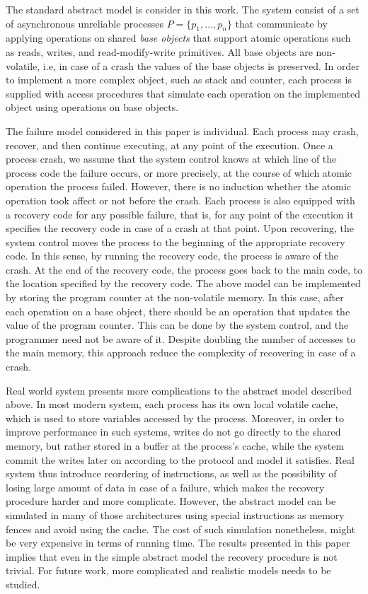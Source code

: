 \documentclass{article}
\begin{document}
The standard abstract model is consider in this work. The system consist of a set of asynchronous unreliable processes $P=\{p_1,\ldots,p_n\}$ that communicate by applying operations on shared \emph{base objects} that support atomic operations such as reads, writes, and read-modify-write primitives. All base objects are non-volatile, i.e, in case of a crash the values of the base objects is preserved. In order to implement a more complex object, such as stack and counter, each process is supplied with access procedures that simulate each operation on the implemented object using operations on base objects.

The failure model considered in this paper is individual. Each process may crash, recover, and then continue executing, at any point of the execution. Once a process crash, we assume that the system control knows at which line of the process code the failure occurs, or more precisely, at the course of which atomic operation the process failed. However, there is no induction whether the atomic operation took affect or not before the crash. Each process is also equipped with a recovery code for any possible failure, that is, for any point of the execution it specifies the recovery code in case of a crash at that point. Upon recovering, the system control moves the process to the beginning of the appropriate recovery code. In this sense, by running the recovery code, the process is aware of the crash. At the end of the recovery code, the process goes back to the main code, to the location specified by the recovery code. The above model can be implemented by storing the program counter at the non-volatile memory. In this case, after each operation on a base object, there should be an operation that updates the value of the program counter. This can be done by the system control, and the programmer need not be aware of it. Despite doubling the number of accesses to the main memory, this approach reduce the complexity of recovering in case of a crash.

Real world system presents more complications to the abstract model described above. In most modern system, each process has its own local volatile cache, which is used to store variables accessed by the process. Moreover, in order to improve performance in such systems, writes do not go directly to the shared memory, but rather stored in a buffer at the process's cache, while the system commit the writes later on according to the protocol and model it satisfies. Real system thus introduce reordering of instructions, as well as the possibility of losing large amount of data in case of a failure, which makes the recovery procedure harder and more complicate. However, the abstract model can be simulated in many of those architectures using special instructions as memory fences and avoid using the cache. The cost of such simulation nonetheless, might be very expensive in terms of running time.
The results presented in this paper implies that even in the simple abstract model the recovery procedure is not trivial. For future work, more complicated and realistic models needs to be studied.
\end{document}
